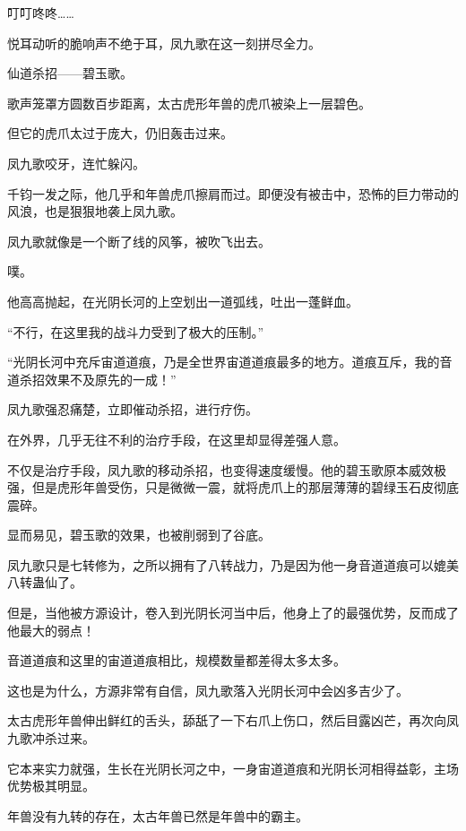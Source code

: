 
\begin{this_body}



叮叮咚咚……

悦耳动听的脆响声不绝于耳，凤九歌在这一刻拼尽全力。

仙道杀招——碧玉歌。

歌声笼罩方圆数百步距离，太古虎形年兽的虎爪被染上一层碧色。

但它的虎爪太过于庞大，仍旧轰击过来。

凤九歌咬牙，连忙躲闪。

千钧一发之际，他几乎和年兽虎爪擦肩而过。即便没有被击中，恐怖的巨力带动的风浪，也是狠狠地袭上凤九歌。

凤九歌就像是一个断了线的风筝，被吹飞出去。

噗。

他高高抛起，在光阴长河的上空划出一道弧线，吐出一蓬鲜血。

“不行，在这里我的战斗力受到了极大的压制。”

“光阴长河中充斥宙道道痕，乃是全世界宙道道痕最多的地方。道痕互斥，我的音道杀招效果不及原先的一成！”

凤九歌强忍痛楚，立即催动杀招，进行疗伤。

在外界，几乎无往不利的治疗手段，在这里却显得差强人意。

不仅是治疗手段，凤九歌的移动杀招，也变得速度缓慢。他的碧玉歌原本威效极强，但是虎形年兽受伤，只是微微一震，就将虎爪上的那层薄薄的碧绿玉石皮彻底震碎。

显而易见，碧玉歌的效果，也被削弱到了谷底。

凤九歌只是七转修为，之所以拥有了八转战力，乃是因为他一身音道道痕可以媲美八转蛊仙了。

但是，当他被方源设计，卷入到光阴长河当中后，他身上了的最强优势，反而成了他最大的弱点！

音道道痕和这里的宙道道痕相比，规模数量都差得太多太多。

这也是为什么，方源非常有自信，凤九歌落入光阴长河中会凶多吉少了。

太古虎形年兽伸出鲜红的舌头，舔舐了一下右爪上伤口，然后目露凶芒，再次向凤九歌冲杀过来。

它本来实力就强，生长在光阴长河之中，一身宙道道痕和光阴长河相得益彰，主场优势极其明显。

年兽没有九转的存在，太古年兽已然是年兽中的霸主。


\end{this_body}

